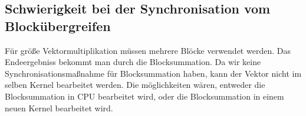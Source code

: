 \subsection{Schwierigkeit bei der Synchronisation vom Blockübergreifen}
Für größe Vektormultiplikation müssen mehrere Blöcke verwendet werden. Das Endeergebniss bekommt man durch die Blocksummation. Da wir keine Synchronisationsmaßnahme für Blocksummation haben, kann der Vektor nicht im selben Kernel bearbeitet werden. Die möglichkeiten wären, entweder die Blocksummation in CPU bearbeitet wird, oder die Blocksummation in einem neuen Kernel bearbeitet wird.